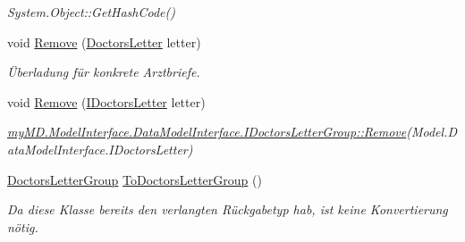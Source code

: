 \begin{CompactItemize}
\begin{CompactList}\small\item\em System.Object::Get\-Hash\-Code() \item\end{CompactList}\item 
void \hyperlink{classmy_m_d_1_1_model_1_1_data_model_1_1_doctors_letter_group_f605263c549fdd56e71759fcd7d2c552}{Remove} (\hyperlink{classmy_m_d_1_1_model_1_1_data_model_1_1_doctors_letter}{Doctors\-Letter} letter)
\begin{CompactList}\small\item\em \"{U}berladung f\"{u}r konkrete Arztbriefe. \item\end{CompactList}\item 
\hypertarget{classmy_m_d_1_1_model_1_1_data_model_1_1_doctors_letter_group_938bc29cf5917f270a203b621472c238}{
void \hyperlink{classmy_m_d_1_1_model_1_1_data_model_1_1_doctors_letter_group_938bc29cf5917f270a203b621472c238}{Remove} (\hyperlink{interfacemy_m_d_1_1_model_interface_1_1_data_model_interface_1_1_i_doctors_letter}{IDoctors\-Letter} letter)}
\label{db/dfe/classmy_m_d_1_1_model_1_1_data_model_1_1_doctors_letter_group_938bc29cf5917f270a203b621472c238}

\begin{CompactList}\small\item\em \hyperlink{interfacemy_m_d_1_1_model_interface_1_1_data_model_interface_1_1_i_doctors_letter_group_938bc29cf5917f270a203b621472c238}{my\-MD.Model\-Interface.Data\-Model\-Interface.IDoctors\-Letter\-Group::Remove}(Model.Data\-Model\-Interface.IDoctors\-Letter) \item\end{CompactList}\item 
\hyperlink{classmy_m_d_1_1_model_1_1_data_model_1_1_doctors_letter_group}{Doctors\-Letter\-Group} \hyperlink{classmy_m_d_1_1_model_1_1_data_model_1_1_doctors_letter_group_6135e1709db8de80bcc0241d6d99880e}{To\-Doctors\-Letter\-Group} ()
\begin{CompactList}\small\item\em Da diese Klasse bereits den verlangten R\"{u}ckgabetyp hab, ist keine Konvertierung n\"{o}tig. \item\end{CompactList}\end{CompactItemize}
